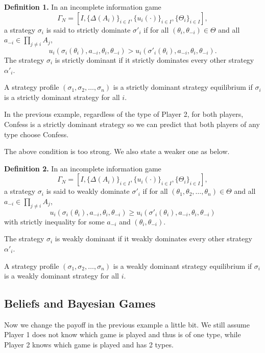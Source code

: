 \documentclass[12pt, oneside]{article}
\begin{document}
\textbf{Definition 1.} In an incomplete information game 
\[
\Gamma_N = [I, \{\Delta(A_i)\}_{i\in I}, \{u_i(\cdot)\}_{i\in I}, \{\Theta_i\}_{i\in I}],
\]
a strategy \(\sigma_i\) is said to strictly dominate \(\sigma'_i\) if for all \((\theta_i, \theta_{-i}) \in \Theta\) and all \(a_{-i} \in \prod_{j \neq i} A_j\),
\[
u_i(\sigma_i(\theta_i), a_{-i}, \theta_i, \theta_{-i}) > u_i(\sigma'_i(\theta_i), a_{-i}, \theta_i, \theta_{-i}).
\]
The strategy \(\sigma_i\) is strictly dominant if it strictly dominates every other strategy \(\alpha'_i\).

\vspace{0.5cm}

A strategy profile \((\sigma_1, \sigma_2, \dots, \sigma_n)\) is a strictly dominant strategy equilibrium if \(\sigma_i\) is a strictly dominant strategy for all \(i\).

In the previous example, regardless of the type of Player 2, for both players, Confess is a strictly dominant strategy so we can predict that both players of any type choose Confess.

The above condition is too strong. We also state a weaker one as below.

\vspace{0.5cm}

\textbf{Definition 2.} In an incomplete information game \[
\Gamma_N = [I, \{\Delta(A_i)\}_{i\in I}, \{u_i(\cdot)\}_{i\in I}, \{\Theta_i\}_{i\in I}],
\]
a strategy \(\sigma_i\) is said to weakly dominate \(\sigma'_i\) if for all \((\theta_1, \theta_2, \dots, \theta_n) \in \Theta\) and all \(a_{-i} \in \prod_{j \neq i} A_j\),
\[
u_i(\sigma_i(\theta_i), a_{-i}, \theta_i, \theta_{-i}) \geq u_i(\sigma'_i(\theta_i), a_{-i}, \theta_i, \theta_{-i})
\]
with strictly inequality for some \(a_{-i}\) and \((\theta_i, \theta_{-i})\).

The strategy \(\sigma_i\) is weakly dominant if it weakly dominates every other strategy \(\alpha'_i\).

A strategy profile \((\sigma_1, \sigma_2, \dots, \sigma_n)\) is a weakly dominant strategy equilibrium if \(\sigma_i\) is a weakly dominant strategy for all \(i\).

\subsection{Beliefs and Bayesian Games}
Now we change the payoff in the previous example a little bit. We still assume Player 1 does not know which game is played and thus is of one type, while Player 2 knows which game is played and has 2 types.
\end{document}

